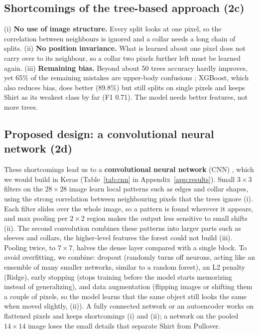 \documentclass[11pt,a4paper]{article}
\begin{document}
\subsection{Shortcomings of the tree-based approach (2c)}
(i) \textbf{No use of image structure.} Every split looks at one pixel, so the correlation between neighbours is ignored and a collar needs a long chain of splits. (ii) \textbf{No position invariance.} What is learned about one pixel does not carry over to its neighbour, so a collar two pixels further left must be learned again. (iii) \textbf{Remaining bias.} Beyond about 50 trees accuracy hardly improves, yet 65\% of the remaining mistakes are upper-body confusions ; XGBoost, which also reduces bias, does better (89.8\%) but still splits on single pixels and keeps Shirt as its weakest class by far (F1 0.71). The model needs better features, not more trees.

\subsection{Proposed design: a convolutional neural network (2d)}
These shortcomings lead us to a \textbf{convolutional neural network} (CNN) \citep{lecun1998}, which we would build in Keras (Table~\ref{tab:cnn} in Appendix~\ref{app:results}). Small $3\times3$ filters on the $28\times28$ image learn local patterns such as edges and collar shapes, using the strong correlation between neighbouring pixels that the trees ignore (i). Each filter slides over the whole image, so a pattern is found wherever it appears, and max pooling per $2\times2$ region makes the output less sensitive to small shifts (ii). The second convolution combines these patterns into larger parts such as sleeves and collars, the higher-level features the forest could not build (iii). Pooling twice, to $7\times7$, halves the dense layer compared with a single block. To avoid overfitting, we combine: dropout (randomly turns off neurons, acting like an ensemble of many smaller networks, similar to a random forest), an L2 penalty (Ridge), early stopping (stops training before the model starts memorizing instead of generalizing), and data augmentation (flipping images or shifting them a couple of pixels, so the model learns that the same object still looks the same when moved slightly, (ii)). A fully connected network or an autoencoder works on flattened pixels and keeps shortcomings (i) and (ii); a network on the pooled $14\times14$ image loses the small details that separate Shirt from Pullover.
\end{document}
